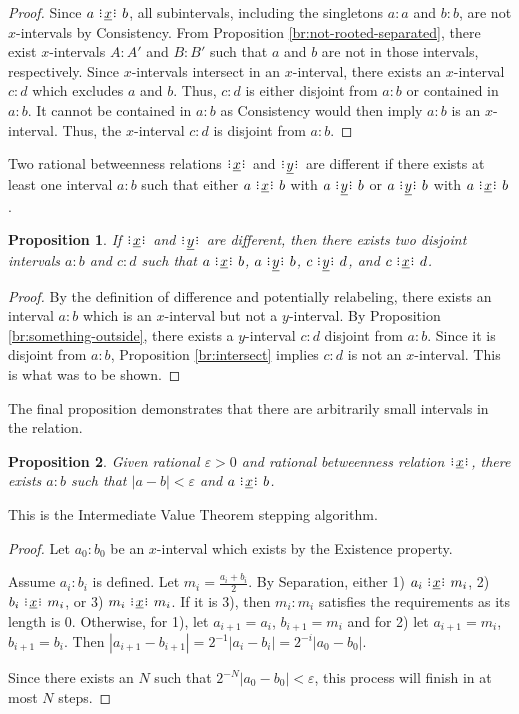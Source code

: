 \documentclass[12pt]{article}
\newtheorem{proposition}{Proposition}[section]
\begin{document}
\begin{proof}
    Since \sout{$a \xrel b$}, all subintervals, including the singletons $a:a$ and $b:b$, are not $x$-intervals by Consistency. From Proposition \ref{br:not-rooted-separated}, there exist $x$-intervals $A:A'$ and $B:B'$ such that $a$ and $b$ are not in those intervals, respectively. Since $x$-intervals intersect in an $x$-interval, there exists an $x$-interval $c:d$ which excludes $a$ and $b$. Thus, $c:d$ is either disjoint from $a:b$ or contained in $a:b$. It cannot be contained in $a:b$ as Consistency would then imply $a:b$ is an $x$-interval. Thus, the $x$-interval $c:d$ is disjoint from $a:b$.
\end{proof}


Two rational betweenness relations $\xrel$ and $\xrel[y]$ are different if there exists at least one interval $a:b$ such that either $a \xrel b$ with \sout{$a \xrel[y] b$} or $a \xrel[y] b$ with \sout{$a \xrel b$}. 

\begin{proposition}\label{br:different}
    If $\xrel$ and $\xrel[y]$ are different, then there exists two disjoint intervals $a:b$ and $c:d$ such that $a \xrel b$, \sout{$a \xrel[y] b$}, $c \xrel[y] d$, and \sout{$c \xrel d$}.
\end{proposition}


\begin{proof}
    By the definition of difference and potentially relabeling, there exists an interval $a:b$ which is an $x$-interval but not a $y$-interval. By Proposition \ref{br:something-outside}, there exists a $y$-interval $c:d$ disjoint from $a:b$. Since it is disjoint from $a:b$, Proposition \ref{br:intersect} implies $c:d$ is not an $x$-interval. This is what was to be shown. 
\end{proof}


The final proposition demonstrates that there are arbitrarily small intervals in the relation. 

\begin{proposition}
    Given rational $\varepsilon >0$ and rational betweenness relation $\xrel$, there exists $a:b$ such that $|a-b| < \varepsilon$ and $a \xrel b$. 
\end{proposition}

This is the Intermediate Value Theorem stepping algorithm. 

\begin{proof}
    Let $a_0:b_0$ be an $x$-interval which exists by the Existence property.
    
    Assume $a_i:b_i$ is defined. Let $m_i = \frac{a_i + b_i}{2}$. By Separation, either 1) $a_i \xrel m_i$, 2) $b_i \xrel m_i$, or 3) $m_i \xrel m_i$. If it is 3), then $m_i:m_i$ satisfies the requirements as its length is 0. Otherwise, for 1), let $a_{i+1}= a_i$, $b_{i+1} = m_i$ and for 2) let $a_{i+1} = m_i$, $b_{i+1} = b_i$. Then $|a_{i+1} - b_{i+1}| = 2^{-1} |a_i-b_i|= 2^{-i} |a_0-b_0|$. 

    Since there exists an $N$ such that $2^{-N} |a_0-b_0| < \varepsilon$, this process will finish in at most $N$ steps. 
\end{proof}
\end{document}
